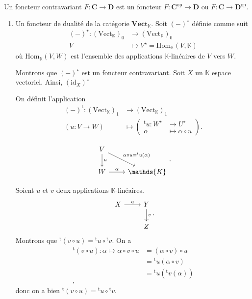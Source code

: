 \begin{rmk}
  Un foncteur contravariant $F : \mathbf{C} \to \mathbf{D}$ est un foncteur $F : \mathbf{C}^{\mathrm{op}} \to \mathbf{D}$ ou $F : \mathbf{C} \to \mathbf{D}^{\mathrm{op}}$.
\end{rmk}

\begin{exm}
  \begin{enumerate}
    \item Un foncteur de dualité de la catégorie $\mathbf{Vect}_\mathds{K}$.
      Soit $(-)^\star$ définie comme suit
       \begin{align*}
         (-)^\star: (\mathrm{Vect}_\mathds{K})_0 &\longrightarrow (\mathrm{Vect}_\mathds{K})_0  \\
         V&\longmapsto  V^\star = \mathrm{Hom}_\mathds{K}(V,\mathds{K})
      \end{align*}
      où $\mathrm{Hom}_\mathds{K}(V,W)$ est l'ensemble des applications $\mathds{K}$-linéaires de $V$ vers $W$.

      Montrons que $(-)^\star$ est un foncteur contravariant.
      Soit $X$ un $\mathbb{K}$ espace vectoriel.
      Ainsi, $(\mathrm{id}_X)^\star $

      On définit l'application 
      \begin{align*}
        (-)^\mathrm{t} : (\mathrm{Vect}_\mathds{K})_1 &\longrightarrow (\mathrm{Vect}_\mathds{K})_1 \\
        (u : V \to W) &\longmapsto 
        \left(
        \begin{array}{rl}
          {}^\mathrm{t} u : W^\star &\to U^\star \\
          \alpha &\mapsto \alpha \circ u
        \end{array}
        \right)
      .\end{align*}

      \[
        \begin{tikzcd}
          V \arrow{d}{u}\arrow{dr}{\alpha \circ u = {}^\mathrm{t}u(\alpha)}  \\
          W \arrow{r}{\alpha} & \mathds{K}
        \end{tikzcd}
      .\]

      Soient $u$ et $v$ deux applications $\mathds{K}$-linéaires.
      \[
        \begin{tikzcd}
          X \arrow{r}{u} & Y \arrow{d}{v}\\
                         &Z
        \end{tikzcd}
      .\]
      Montrons que ${}^\mathrm{t}(v\circ u) = {}^\mathrm{t}u \circ {}^\mathrm{t}v$.
      On a 
      \begin{align*}
        {}^\mathrm{t} (v \circ u) : \alpha \mapsto \alpha \circ v \circ u &= (\alpha \circ v) \circ u \\
        &= {}^\mathrm{t} u(\alpha \circ v) \\
        &= {}^\mathrm{t}u({}^\mathrm{t}v(\alpha)) \\
      ,\end{align*}
      donc on a bien ${}^\mathrm{t}(v\circ u) = {}^\mathrm{t}u \circ {}^\mathrm{t}v$.
  \end{enumerate}
\end{exm}

